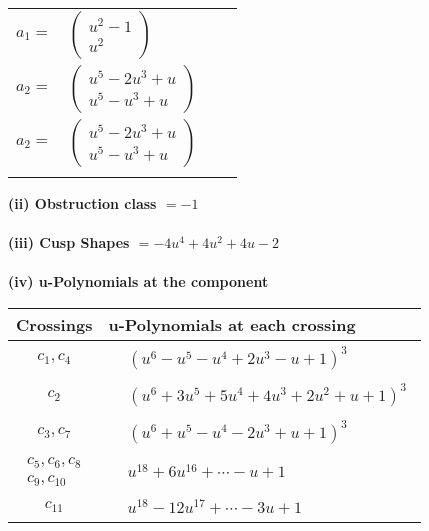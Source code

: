 \documentclass[1p]{elsarticle_modified}
\theoremstyle{definition}
\begin{document}
\begin{tabular}{m{7pt} m{180pt} m{7pt} m{180pt} }
\flushright $a_{1}=$&$\begin{pmatrix}u^2-1\\u^2\end{pmatrix}$ \\
\flushright $a_{2}=$&$\begin{pmatrix}u^5-2 u^3+u\\u^5- u^3+u\end{pmatrix}$\\ \flushright $a_{2}=$&$\begin{pmatrix}u^5-2 u^3+u\\u^5- u^3+u\end{pmatrix}$\\&\end{tabular}
\flushleft \textbf{(ii) Obstruction class $= -1$}\\~\\
\flushleft \textbf{(iii) Cusp Shapes $= -4 u^4+4 u^2+4 u-2$}\\~\\
\newpage\renewcommand{\arraystretch}{1}
\flushleft \textbf{(iv) u-Polynomials at the component}\newline \\
\begin{tabular}{m{50pt}|m{274pt}}
Crossings & \hspace{64pt}u-Polynomials at each crossing \\
\hline $$\begin{aligned}c_{1},c_{4}\end{aligned}$$&$\begin{aligned}
&(u^6- u^5- u^4+2 u^3- u+1)^3
\end{aligned}$\\
\hline $$\begin{aligned}c_{2}\end{aligned}$$&$\begin{aligned}
&(u^6+3 u^5+5 u^4+4 u^3+2 u^2+u+1)^3
\end{aligned}$\\
\hline $$\begin{aligned}c_{3},c_{7}\end{aligned}$$&$\begin{aligned}
&(u^6+u^5- u^4-2 u^3+u+1)^3
\end{aligned}$\\
\hline $$\begin{aligned}c_{5},c_{6},c_{8}\\c_{9},c_{10}\end{aligned}$$&$\begin{aligned}
&u^{18}+6 u^{16}+\cdots- u+1
\end{aligned}$\\
\hline $$\begin{aligned}c_{11}\end{aligned}$$&$\begin{aligned}
&u^{18}-12 u^{17}+\cdots-3 u+1
\end{aligned}$\\
\hline
\end{tabular}\\~\\
\end{document}
